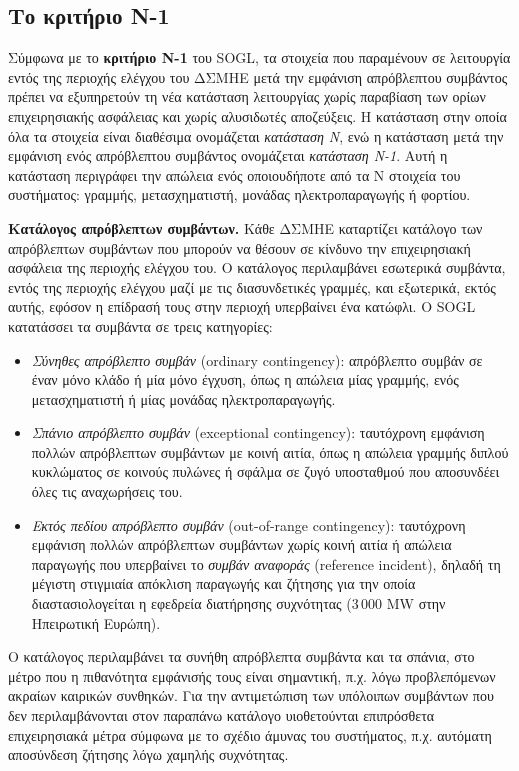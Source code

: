 \subsection{Το κριτήριο N-1}
\label{sec:n1}

Σύμφωνα με το \textbf{κριτήριο N-1} του SOGL, τα στοιχεία που παραμένουν σε λειτουργία
εντός της περιοχής ελέγχου του ΔΣΜΗΕ μετά την εμφάνιση απρόβλεπτου συμβάντος πρέπει να
εξυπηρετούν τη νέα κατάσταση λειτουργίας χωρίς παραβίαση των ορίων επιχειρησιακής ασφάλειας
και χωρίς αλυσιδωτές αποζεύξεις. Η κατάσταση στην οποία όλα τα στοιχεία είναι διαθέσιμα ονομάζεται \emph{κατάσταση N}, ενώ η κατάσταση μετά την
εμφάνιση ενός απρόβλεπτου συμβάντος ονομάζεται \emph{κατάσταση N-1}. Αυτή η κατάσταση περιγράφει την απώλεια ενός οποιουδήποτε από τα N στοιχεία του
συστήματος: γραμμής, μετασχηματιστή, μονάδας ηλεκτροπαραγωγής ή φορτίου.

\textbf{Κατάλογος απρόβλεπτων συμβάντων.} Κάθε ΔΣΜΗΕ καταρτίζει κατάλογο των απρόβλεπτων συμβάντων που μπορούν να θέσουν σε κίνδυνο την
επιχειρησιακή ασφάλεια της περιοχής ελέγχου του. Ο κατάλογος περιλαμβάνει εσωτερικά συμβάντα,
εντός της περιοχής ελέγχου μαζί με τις διασυνδετικές γραμμές, και εξωτερικά, εκτός αυτής, εφόσον
η επίδρασή τους στην περιοχή υπερβαίνει ένα κατώφλι. Ο SOGL κατατάσσει τα συμβάντα σε τρεις κατηγορίες:

\begin{itemize}
\item \emph{Σύνηθες απρόβλεπτο συμβάν} (ordinary contingency): απρόβλεπτο συμβάν σε έναν
      μόνο κλάδο ή μία μόνο έγχυση, όπως η απώλεια μίας γραμμής, ενός μετασχηματιστή ή μίας
      μονάδας ηλεκτροπαραγωγής.
\item \emph{Σπάνιο απρόβλεπτο συμβάν} (exceptional contingency): ταυτόχρονη εμφάνιση πολλών
      απρόβλεπτων συμβάντων με κοινή αιτία, όπως η απώλεια γραμμής διπλού κυκλώματος σε κοινούς
      πυλώνες ή σφάλμα σε ζυγό υποσταθμού που αποσυνδέει όλες τις αναχωρήσεις του.
\item \emph{Εκτός πεδίου απρόβλεπτο συμβάν} (out-of-range contingency): ταυτόχρονη εμφάνιση
      πολλών απρόβλεπτων συμβάντων χωρίς κοινή αιτία ή απώλεια παραγωγής που υπερβαίνει το
      \emph{συμβάν αναφοράς} (reference incident), δηλαδή τη μέγιστη στιγμιαία απόκλιση
      παραγωγής και ζήτησης για την οποία διαστασιολογείται η εφεδρεία διατήρησης συχνότητας
      (3\,000 MW στην Ηπειρωτική Ευρώπη).
\end{itemize}

Ο κατάλογος περιλαμβάνει τα συνήθη απρόβλεπτα συμβάντα και τα σπάνια, στο μέτρο που η πιθανότητα εμφάνισής τους είναι σημαντική, π.χ. λόγω προβλεπόμενων ακραίων καιρικών συνθηκών. Για την αντιμετώπιση των υπόλοιπων συμβάντων που δεν περιλαμβάνονται στον παραπάνω κατάλογο υιοθετούνται επιπρόσθετα επιχειρησιακά μέτρα σύμφωνα με το σχέδιο άμυνας του συστήματος, π.χ. αυτόματη αποσύνδεση ζήτησης λόγω χαμηλής συχνότητας.

